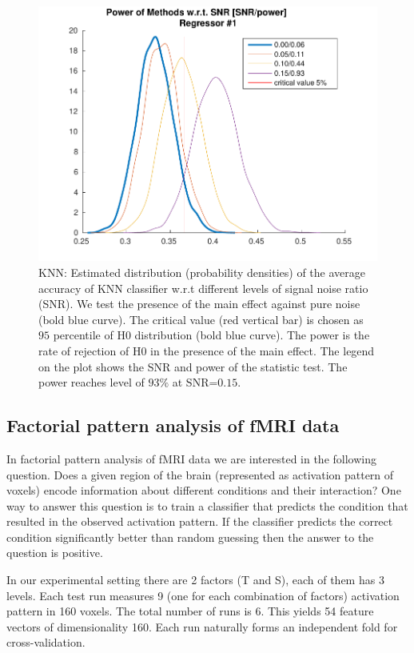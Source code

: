 \documentclass[paper=a4,fontsize=12pt]{scrartcl}
\numberwithin{equation}{section} %
\numberwithin{figure}{section} %
\numberwithin{table}{section} %
\begin{document}
\begin{figure}[t]\centering
\includegraphics{sample_knn_conv_1}  
\caption{KNN: Estimated distribution (probability densities) of the average accuracy of KNN classifier w.r.t different levels of signal noise ratio (SNR). We test the presence of the main effect against pure noise (bold blue curve). The critical value (red vertical bar) is chosen as $95$ percentile of H0 distribution (bold blue curve). The power is the rate of rejection of H0 in the presence of the main effect. The legend on the plot shows the SNR and power of the statistic test. The power reaches level of $93\%$ at SNR=$0.15$.}\label{fig:knn convergence}
\end{figure}

\subsection{Factorial pattern analysis of fMRI data}

In factorial pattern analysis of fMRI data we are interested in the following question. Does a given region of the brain (represented as activation pattern of voxels) encode information about different conditions and their interaction? One way to answer this question is to train a classifier that predicts the condition that resulted in the observed activation pattern. If the classifier predicts the correct condition significantly better than random guessing then the answer to the question is positive.

In our experimental setting there are 2 factors (T and S), each of them has 3 levels. Each test run measures 9 (one for each combination of factors) activation pattern in 160 voxels. The total number of runs is 6. This yields 54 feature vectors of dimensionality 160. Each run naturally forms an independent fold for cross-validation.
\end{document}
